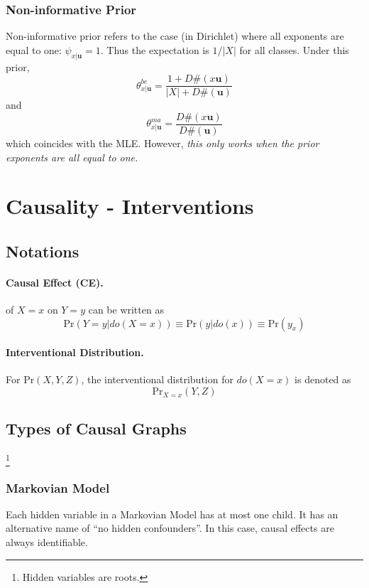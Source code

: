 \documentclass[11pt]{article}
\newcommand{\bu}{\mathbf{u}}
\newcommand{\pr}{\mathrm{Pr}}
\begin{document}
\subsubsection{Non-informative Prior} 
Non-informative prior refers to the case (in Dirichlet) where all exponents are equal to one: $\psi_{x | \bu} = 1$. Thus the expectation is $1/|X|$ for all classes. Under this prior, 
\begin{equation}
	\theta^{be}_{x|\bu} = \frac{1 + D\#(x \bu)}{|X| + D \# (\bu)}
\end{equation}
and 
\begin{equation}
	\theta_{x|\bu}^{ma} = \frac{D\#(x \bu)}{D\#(\bu)}
\end{equation}
which coincides with the MLE. However, \textit{this only works when the prior exponents are all equal to one.}


\section{Causality - Interventions}
\subsection{Notations}
\paragraph{Causal Effect (CE).} of $X = x$ on $Y = y$ can be written as
\begin{equation}
	\pr (Y = y | do(X = x)) \equiv \pr (y | do (x)) \equiv \pr(y_x)
\end{equation}

\paragraph{Interventional Distribution.} For $\pr (X, Y, Z)$, the interventional distribution for $do(X = x)$ is denoted as 
\begin{equation}
	\pr _{X = x} (Y, Z)
\end{equation}


\subsection{Types of Causal Graphs}\footnote{Hidden variables are roots.}
\subsubsection{Markovian Model}
Each hidden variable in a Markovian Model has at most one child. It has an alternative name of ``no hidden confounders''. In this case, causal effects are always identifiable. 
\end{document}
